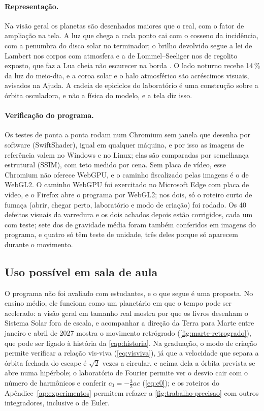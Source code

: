 \paragraph{Representação.} Na visão geral os planetas são desenhados maiores que o real, com o fator de ampliação na tela. A luz que chega a cada ponto cai com o cosseno da incidência, com a penumbra do disco solar no terminador; o brilho devolvido segue a lei de Lambert nos corpos com atmosfera e a de Lommel--Seeliger nos de regolito exposto, que faz a Lua cheia não escurecer na borda \cite{fairbairn2005}. O lado noturno recebe 14\,\% da luz do meio-dia, e a coroa solar e o halo atmosférico são acréscimos visuais, avisados na Ajuda. A cadeia de epiciclos do laboratório é uma construção sobre a órbita osculadora, e não a física do modelo, e a tela diz isso.

\paragraph{Verificação do programa.} Os testes de ponta a ponta rodam num Chromium sem janela que desenha por software (SwiftShader), igual em qualquer máquina, e por isso as imagens de referência valem no Windows e no Linux; elas são comparadas por semelhança estrutural (SSIM), com teto medido por cena. Sem placa de vídeo, esse Chromium não oferece WebGPU, e o caminho fiscalizado pelas imagens é o de WebGL2. O caminho WebGPU foi exercitado no Microsoft Edge com placa de vídeo, e o Firefox abre o programa por WebGL2; nos dois, só o roteiro curto de fumaça (abrir, chegar perto, laboratório e modo de criação) foi rodado. Os 40 defeitos visuais da varredura e os dois achados depois estão corrigidos, cada um com teste; sete dos de gravidade média foram também conferidos em imagens do programa, e quatro só têm teste de unidade, três deles porque só aparecem durante o movimento.

\subsection{Uso possível em sala de aula}\label{cap:ensino}

O programa não foi avaliado com estudantes, e o que segue é uma proposta. No ensino médio, ele funciona como um planetário em que o tempo pode ser acelerado: a visão geral em tamanho real mostra por que os livros desenham o Sistema Solar fora de escala, e acompanhar a direção da Terra para Marte entre janeiro e abril de 2027 mostra o movimento retrógrado (\autoref{fig:marte-retrogrado}), que pode ser ligado à história da \autoref{cap:historia}. Na graduação, o modo de criação permite verificar a relação vis-viva (\autoref{eq:visviva}), já que a velocidade que separa a órbita fechada do escape é $\sqrt2$ vezes a circular, e acima dela a órbita prevista se abre numa hipérbole; o laboratório de Fourier permite ver o desvio cair com o número de harmônicos e conferir $c_0 = -\frac32 ae$ (\autoref{eq:c0}); e os roteiros do Apêndice~\ref{ap:experimentos} permitem refazer a \autoref{fig:trabalho-precisao} com outros integradores, inclusive o de Euler.

